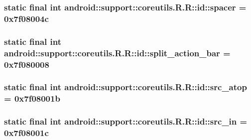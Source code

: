 \hypertarget{classandroid_1_1support_1_1coreutils_1_1_r_1_1id_0d2c8c76d8eb003b6fde5a259d573d0f}{
\subsubsection[{spacer}]{\setlength{\rightskip}{0pt plus 5cm}static final int android::support::coreutils.R.R::id::spacer = 0x7f08004c}}
\label{classandroid_1_1support_1_1coreutils_1_1_r_1_1id_0d2c8c76d8eb003b6fde5a259d573d0f}


\hypertarget{classandroid_1_1support_1_1coreutils_1_1_r_1_1id_df03bea70adaa5545b34cf4835416dc7}{
\subsubsection[{split\_\-action\_\-bar}]{\setlength{\rightskip}{0pt plus 5cm}static final int android::support::coreutils.R.R::id::split\_\-action\_\-bar = 0x7f080008}}
\label{classandroid_1_1support_1_1coreutils_1_1_r_1_1id_df03bea70adaa5545b34cf4835416dc7}


\hypertarget{classandroid_1_1support_1_1coreutils_1_1_r_1_1id_fb763a4d7fa9bd7b59d86fcded0746a0}{
\subsubsection[{src\_\-atop}]{\setlength{\rightskip}{0pt plus 5cm}static final int android::support::coreutils.R.R::id::src\_\-atop = 0x7f08001b}}
\label{classandroid_1_1support_1_1coreutils_1_1_r_1_1id_fb763a4d7fa9bd7b59d86fcded0746a0}


\hypertarget{classandroid_1_1support_1_1coreutils_1_1_r_1_1id_0ae204f081b67ed651f880fa766aa380}{
\subsubsection[{src\_\-in}]{\setlength{\rightskip}{0pt plus 5cm}static final int android::support::coreutils.R.R::id::src\_\-in = 0x7f08001c}}
\label{classandroid_1_1support_1_1coreutils_1_1_r_1_1id_0ae204f081b67ed651f880fa766aa380}


